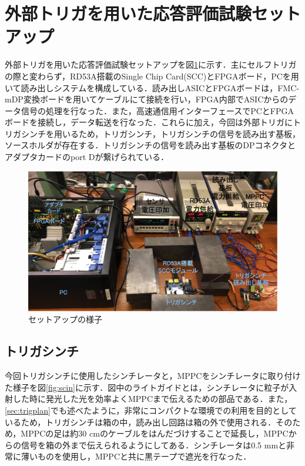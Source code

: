 \section{外部トリガを用いた応答評価試験セットアップ}
外部トリガを用いた応答評価試験セットアップを図\ref{fig:extsetup}に示す．主にセルフトリガの際と変わらず，RD53A搭載のSingle Chip Card(SCC)とFPGAボード，PCを用いて読み出しシステムを構成している．読み出しASICとFPGAボードは，FMC-mDP変換ボードを用いてケーブルにて接続を行い，FPGA内部でASICからのデータ信号の処理を行なった．また，高速通信用インターフェースでPCとFPGAボードを接続し，データ転送を行なった．これらに加え，今回は外部トリガにトリガシンチを用いるため，トリガシンチ，トリガシンチの信号を読み出す基板，ソースホルダが存在する．トリガシンチの信号を読み出す基板のDPコネクタとアダプタカードのport Dが繋げられている．\par

\begin{figure}[h]
  \centering
  \includegraphics[width=15cm]{./figure/extsetup.png}
  \caption{セットアップの様子}
  \label{fig:extsetup}
\end{figure}

\subsection{トリガシンチ}
今回トリガシンチに使用したシンチレータと，MPPCをシンチレータに取り付けた様子を図\ref{fig:scin}に示す．図中のライトガイドとは，シンチレータに粒子が入射した時に発光した光を効率よくMPPCまで伝えるための部品である．また，\ref{sec:trigplan}でも述べたように，非常にコンパクトな環境での利用を目的としているため，トリガシンチは箱の中，読み出し回路は箱の外で使用される．そのため，MPPCの足は約30 $\mathrm{cm}$のケーブルをはんだづけすることで延長し，MPPCからの信号を箱の外まで伝えられるようにしてある．シンチレータは0.5 $\mathrm{mm}$と非常に薄いものを使用し，MPPCと共に黒テープで遮光を行なった．

